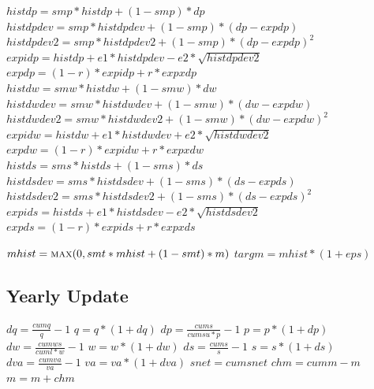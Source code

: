 \documentclass{article}
\begin{document}
\begin{algorithm}[H]
\caption{Yearly Exp}
    \begin{algorithmic}
        \State \(histdp = smp * histdp + (1 - smp) * dp\)
        \State  \(histdpdev = smp * histdpdev + (1 - smp) * (dp - expdp)\)
        \State  \(histdpdev2 = smp * histdpdev2 + (1 - smp) * (dp - expdp)^2\)
        \State  \(expidp = histdp + e1 * histdpdev - e2 * \sqrt{histdpdev2}\)
        \State  \(expdp = (1 - r) * expidp + r * expxdp\)
        \\
        \State  \(histdw = smw * histdw + (1 - smw) * dw\)
        \State  \(histdwdev = smw * histdwdev + (1 - smw) * (dw - expdw)\)
        \State  \(histdwdev2 = smw * histdwdev2 + (1 - smw) * (dw - expdw)^2\)
        \State  \(expidw = histdw + e1 * histdwdev + e2 * \sqrt{histdwdev2}\)
        \State  \(expdw = (1 - r) * expidw + r * expxdw\)
        \\
        \State  \(histds = sms * histds + (1 - sms) * ds\)
        \State  \(histdsdev = sms * histdsdev + (1 - sms) * (ds - expds)\)
        \State  \(histdsdev2 = sms * histdsdev2 + (1 - sms) * (ds - expds)^2\)
        \State  \(expids = histds + e1 * histdsdev - e2 * \sqrt{histdsdev2}\)
        \State  \(expds = (1 - r) * expids + r * expxds\)
    \EndFunction
    \end{algorithmic}
\end{algorithm}

\begin{algorithm}[H]
\caption{Yearly Targ}
    \begin{algorithmic}
        \State $mhist = \Call{max}{0, smt * mhist + (1 - smt) * m}$
        \State $targm = mhist * (1 + eps)$
        \EndFunction
    \end{algorithmic}
\end{algorithm}

\clearpage
\subsection{Yearly Update}

\begin{algorithm}[H]
\caption{Yearly Update}
    \begin{algorithmic}
        \State $dq = \frac{cumq}{q} - 1$
    	\State $q = q * (1 + dq)$
    	\State $dp = \frac{cums}{cumsu * p} - 1$
    	\State $p = p*(1 + dp)$
    	\State $dw = \frac{cumws}{cuml * w} - 1$
    	\State $w = w*(1 + dw)$
    	\State $ds = \frac{cums}{s} - 1$
    	\State $s = s*(1 + ds)$
    	\State $dva = \frac{cumva}{va} - 1$
    	\State $va = va*(1 + dva)$
    	\State $snet = cumsnet$
    	\State $chm = cumm - m$
    	\State $m = m+chm$
        \EndFunction
    \end{algorithmic}
\end{algorithm}
\end{document}
